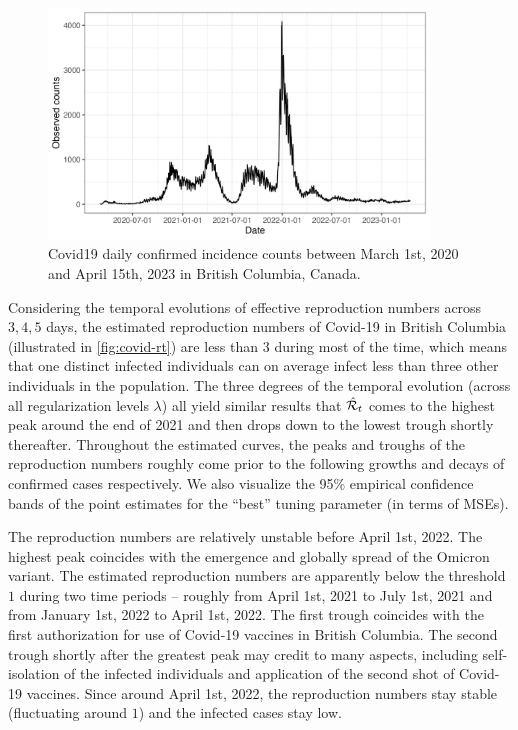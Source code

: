 \begin{figure}[tb]
    \centering
    \includegraphics[width=0.9\textwidth]{fig/covid_dat.png}
    \caption{Covid19 daily confirmed incidence counts between March 1st, 2020 and April 15th, 2023 in British Columbia, Canada.} 
    \label{fig:covid-data}
\end{figure} 

Considering the temporal evolutions of effective reproduction numbers across $3, 4, 5$ days, the estimated reproduction numbers of Covid-19 in British Columbia (illustrated in \autoref{fig:covid-rt}) are less than $3$ during most of the time, which means that one distinct infected individuals can on average infect less than three other individuals in the population. The three degrees of the temporal evolution (across all regularization levels $\lambda$) all yield similar results that $\hat{\mathcal{R}}_t$ comes to the highest peak around the end of 2021 and then drops down to the lowest trough shortly thereafter. Throughout the estimated curves, the peaks and troughs of the reproduction numbers roughly come prior to the following growths and decays of confirmed cases respectively.
We also visualize the 95\% empirical confidence bands of the point estimates for the ``best'' tuning parameter (in terms of MSEs). 

The reproduction numbers are relatively unstable before April 1st, 2022. The highest peak coincides with the emergence and globally spread of the Omicron variant. The estimated reproduction numbers are apparently below the threshold $1$ during two time periods -- roughly from April 1st, 2021 to July 1st, 2021 and from January 1st, 2022 to April 1st, 2022. The first trough coincides with the first authorization for use of Covid-19 vaccines in British Columbia. The second trough shortly after the greatest peak may credit to many aspects, including self-isolation of the infected individuals and application of the second shot of Covid-19 vaccines. Since around April 1st, 2022, the reproduction numbers stay stable (fluctuating around $1$) and the infected cases stay low. 

